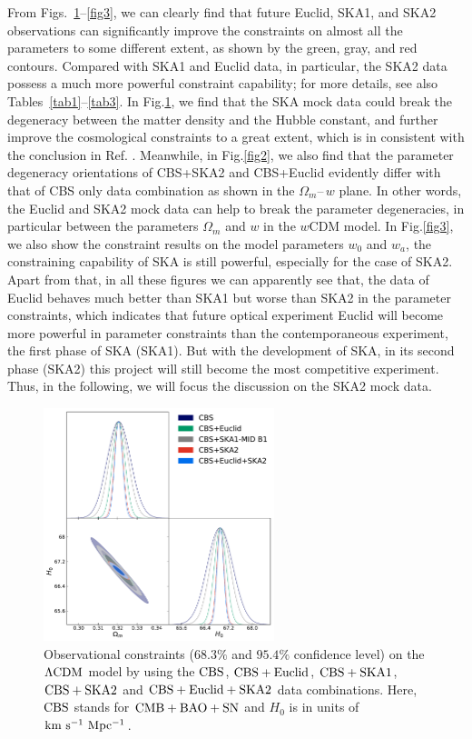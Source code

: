 \documentclass[aps,prd,amsmath,amssymb,showpacs,floats,floatfix,nofootinbib,reprint]{revtex4-1}
\begin{document}
From Figs.~\ref{fig1}--\ref{fig3}, we can clearly find that future Euclid, SKA1, and SKA2 observations can significantly improve the constraints on almost all the parameters to some different extent, as shown by the green, gray, and red contours. Compared with SKA1 and Euclid data, in particular, the SKA2 data possess a much more powerful constraint capability; for more details, see also Tables~\ref{tab1}--\ref{tab3}. In Fig.\;\ref{fig1}, we find that the SKA mock data could break the degeneracy between the matter density and the Hubble constant, and further improve the cosmological constraints to a great extent, which is in consistent with the conclusion in Ref. \cite{Zhang:2019ipd}. Meanwhile, in Fig.\;\ref{fig2}, we also find that the parameter degeneracy orientations of CBS+SKA2 and CBS+Euclid evidently differ with that of CBS only data combination as shown in the $\Omega_{m}$--\,$w$ plane. In other words, the Euclid and SKA2 mock data can help to break the parameter degeneracies, in particular between the parameters $\Omega_{m}$ and $w$ in the $w$CDM model. In Fig.\;\ref{fig3}, we also show the constraint results on the model parameters $w_0$ and $w_a$, the constraining capability of SKA is still powerful, especially for the case of SKA2. Apart from that, in all these figures we can apparently see that, the data of Euclid behaves much better than SKA1 but worse than SKA2 in the parameter constraints, which indicates that future optical experiment Euclid will become more powerful in parameter constraints than the contemporaneous experiment, the first phase of SKA (SKA1). But with the development of SKA,  in its second phase (SKA2) this project will still become the most competitive experiment. Thus, in the following, we will focus the discussion on the SKA2 mock data. 

\begin{figure}[!htp]
\includegraphics[width=0.6\textwidth]{lcdm.pdf}
\caption{Observational constraints ($68.3\%$ and $95.4\%$ confidence level) on the ${\rm \Lambda CDM}$ model by using the ${\rm CBS}$, ${\rm CBS+Euclid}$, ${\rm CBS+SKA1}$, ${\rm CBS+SKA2}$ and ${\rm CBS+Euclid+SKA2}$ data combinations. Here, ${\rm CBS}$ stands for ${\rm CMB+BAO+SN}$ and $H_0$ is in units of ${\rm km\ s^{-1}\ Mpc^{-1}}$.}
\label{fig1}
\end{figure}
\end{document}
